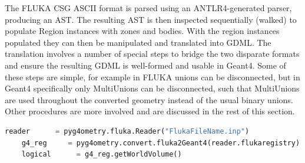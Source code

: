 \documentclass[final,5p,times,twocolumn]{elsarticle}
\newcommand{\PYGEOMETRY}{\textsc{Pyg4ometry}}
\begin{document}
The FLUKA CSG ASCII format is parsed using an ANTLR4-generated parser,
producing an AST.  The resulting AST is then inspected sequentially (walked)
to populate Region instances with zones and bodies.  With the region
instances populated they can then be manipulated and translated into GDML.
The translation involves a number of special steps to bridge the two
disparate formats and ensure the resulting GDML is well-formed and usable
in Geant4.  Some of these steps are simple, for example in FLUKA unions can
be disconnected, but in Geant4 specifically only MultiUnions can be
disconnected, such that MultiUnions are used throughout the converted
geometry instead of the usual binary unions.  Other procedures are more
involved and are discussed in the rest of this section.

\begin{lstlisting}[caption={A simple \PYGEOMETRY{} Python script to load a FLUKA file.},label={lst:pythonFlukaLoading}, language=Python]
    reader      = pyg4ometry.fluka.Reader("FlukaFileName.inp")
    g4_reg     = pyg4ometry.convert.fluka2Geant4(reader.flukaregistry)
    logical      = g4_reg.getWorldVolume()
\end{lstlisting}
\end{document}
